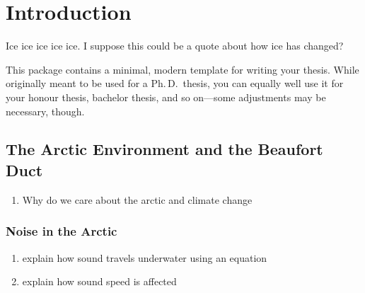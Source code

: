 
\chapter{Introduction}

\begin{center}
  \begin{minipage}{0.5\textwidth}
    \begin{small}
      Ice ice ice ice ice. I suppose this could be a quote about how ice has changed?
    \end{small}
  \end{minipage}
  \vspace{0.5cm}
\end{center}

\noindent This package contains a minimal, modern template for writing your thesis. While originally meant to be used for a Ph.\,D.\ thesis, you can equally well use it for your honour thesis, bachelor thesis, and so on---some adjustments may be necessary, though.

\section{The Arctic Environment and the Beaufort Duct}

\begin{enumerate}
\item Why do we care about the arctic and climate change

\end{enumerate}



\subsection{Noise in the Arctic}
\begin{enumerate}
\item explain how sound travels underwater using an equation
\item explain how sound speed is affected
\end{enumerate}

